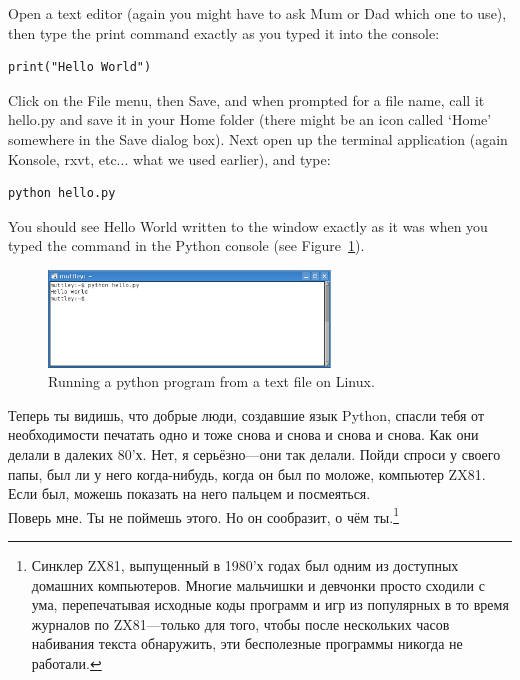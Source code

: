 \begin{LINUX}
Open a text editor (again you might have to ask Mum or Dad which one to use), then type the print command exactly as you typed it into the console:

\begin{listing}
\begin{verbatim}
print("Hello World")
\end{verbatim}
\end{listing}

Click on the File menu, then Save, and when prompted for a file name, call it hello.py and save it in your Home folder (there might be an icon called `Home' somewhere in the Save dialog box).  Next open up the terminal application (again Konsole, rxvt, etc... what we used earlier), and type:

\begin{listing}
\begin{verbatim}
python hello.py
\end{verbatim}
\end{listing}

You should see Hello World written to the window exactly as it was when you typed the command in the Python console (see Figure~\ref{fig9}).

\begin{figure}
\begin{center}
\includegraphics[width=75mm]{figure9.eps}
\end{center}
\caption{Running a python program from a text file on Linux.}\label{fig9}
\end{figure}
\end{LINUX}

Теперь ты видишь, что добрые люди, создавшие язык Python, спасли тебя от необходимости печатать одно и тоже снова и снова и снова и снова.  Как они делали в далеких 80'х. Нет, я серьёзно---они так делали.  Пойди спроси у своего папы, был ли у него когда-нибудь, когда он был по моложе, компьютер ZX81.\\

\noindent
Если был, можешь показать на него пальцем и посмеяться.\\

\noindent
Поверь мне.  Ты не поймешь этого.  Но он сообразит, о чём ты.\footnote{Синклер ZX81, выпущенный в 1980'х годах был одним из доступных домашних компьютеров.  Многие мальчишки и девчонки просто сходили с ума, перепечатывая исходные коды программ и игр из популярных в то время журналов по ZX81---только для того, чтобы после нескольких часов набивания текста обнаружить, эти бесполезные программы никогда не работали.}

